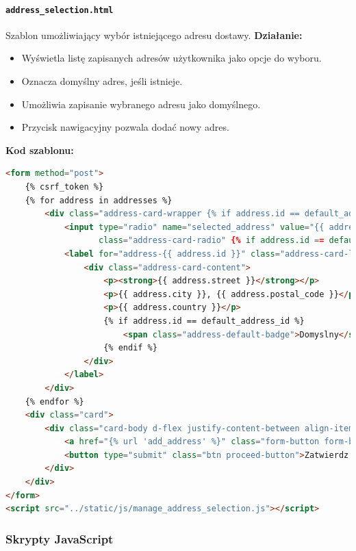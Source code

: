 \documentclass[12pt,a4paper,oneside]{article}
\theoremstyle{definition}
\numberwithin{equation}{section}
\begin{document}
\paragraph{\texttt{address\_selection.html}}
\label{sec:address_selection_template}
Szablon umożliwiający wybór istniejącego adresu dostawy.  
\textbf{Działanie:}
\begin{itemize}
    \item Wyświetla listę zapisanych adresów użytkownika jako opcje do wyboru.
    \item Oznacza domyślny adres, jeśli istnieje.
    \item Umożliwia zapisanie wybranego adresu jako domyślnego.
    \item Przycisk nawigacyjny pozwala dodać nowy adres.
\end{itemize}
\textbf{Kod szablonu:}
\begin{lstlisting}[language=HTML, caption=Szablon address\_selection.html]
<form method="post">
    {% csrf_token %}
    {% for address in addresses %}
        <div class="address-card-wrapper {% if address.id == default_address_id %}address-default{% endif %}">
            <input type="radio" name="selected_address" value="{{ address.id }}" id="address-{{ address.id }}"
                   class="address-card-radio" {% if address.id == default_address_id %}checked{% endif %}>
            <label for="address-{{ address.id }}" class="address-card-label">
                <div class="address-card-content">
                    <p><strong>{{ address.street }}</strong></p>
                    <p>{{ address.city }}, {{ address.postal_code }}</p>
                    <p>{{ address.country }}</p>
                    {% if address.id == default_address_id %}
                        <span class="address-default-badge">Domyslny</span>
                    {% endif %}
                </div>
            </label>
        </div>
    {% endfor %}
    <div class="card">
        <div class="card-body d-flex justify-content-between align-items-center">
            <a href="{% url 'add_address' %}" class="form-button form-button-secondary">Dodaj nowy adres</a>
            <button type="submit" class="btn proceed-button">Zatwierdz adres</button>
        </div>
    </div>
</form>
<script src="../static/js/manage_address_selection.js"></script>
\end{lstlisting}





\subsubsection*{Skrypty JavaScript}
\end{document}
